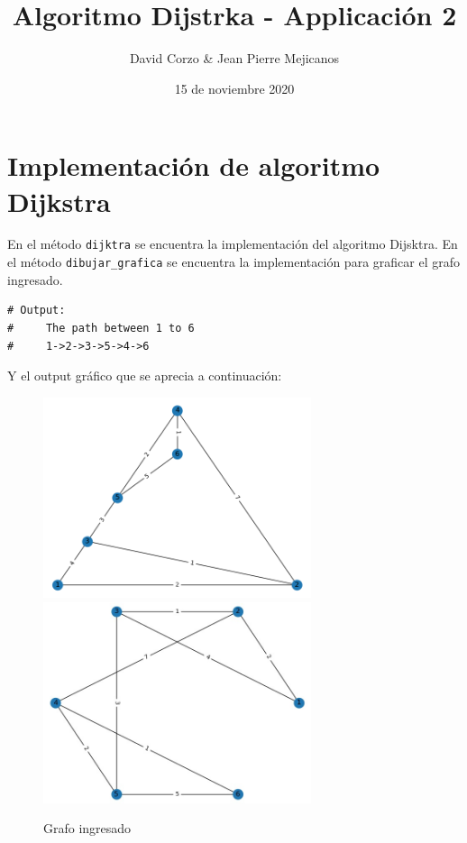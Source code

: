 \documentclass{article}
\title{Algoritmo Dijstrka - Applicación 2}
\date{15 de noviembre 2020} %
\author{David Corzo \& Jean Pierre Mejicanos}
\begin{document}
\maketitle

\section{Implementación de algoritmo Dijkstra}
En el método \verb|dijktra| se encuentra la implementación del algoritmo Dijsktra. En el método \verb|dibujar_grafica| se encuentra la implementación para graficar el grafo ingresado.
\begin{verbatim}
# Output:
#     The path between 1 to 6
#     1->2->3->5->4->6
\end{verbatim}
Y el output gráfico que se aprecia a continuación: 
\begin{figure}[H]
    \centering
    \includegraphics[width=0.7\textwidth]{grafo0}
    \includegraphics[width=0.7\textwidth]{grafo1.jpeg}
    \caption{Grafo ingresado}
\end{figure}
\end{document}
